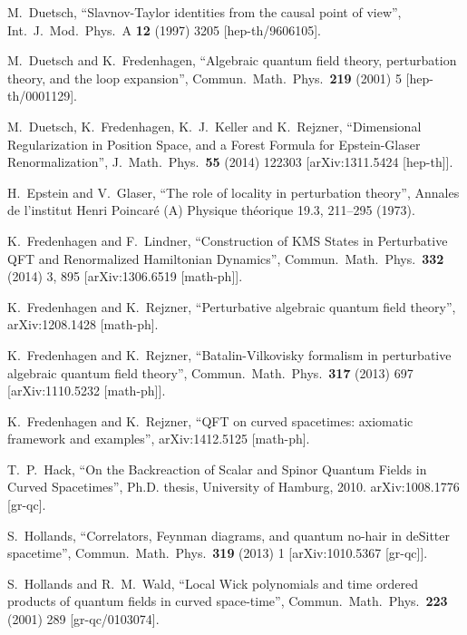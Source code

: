 \documentclass[a4paper,10pt,twoside]{article}
\numberwithin{equation}{section}
\newcounter{and}
\theoremstyle{plain}
\theoremstyle{definition}
\begin{document}
\begin{thebibliography}{100}
  M.~Duetsch,
  ``Slavnov-Taylor identities from the causal point of view'',
  Int.\ J.\ Mod.\ Phys.\ A {\bf 12} (1997) 3205
  [hep-th/9606105].
  
  M.~Duetsch and K.~Fredenhagen,
  ``Algebraic quantum field theory, perturbation theory, and the loop expansion'',
  Commun.\ Math.\ Phys.\  {\bf 219} (2001) 5
  [hep-th/0001129].
  
  M.~Duetsch, K.~Fredenhagen, K.~J.~Keller and K.~Rejzner,
  ``Dimensional Regularization in Position Space, and a Forest Formula for Epstein-Glaser Renormalization'',
  J.\ Math.\ Phys.\  {\bf 55} (2014) 122303
  [arXiv:1311.5424 [hep-th]].  

  H.~Epstein and V.~Glaser, 
  ``The role of locality in perturbation theory'',
  Annales de l'institut Henri Poincaré (A) Physique théorique 19.3, 211--295 (1973).

  K.~Fredenhagen and F.~Lindner,
  ``Construction of KMS States in Perturbative QFT and Renormalized Hamiltonian Dynamics'',
  Commun.\ Math.\ Phys.\  {\bf 332} (2014) 3,  895
  [arXiv:1306.6519 [math-ph]].
  
  K.~Fredenhagen and K.~Rejzner,
  ``Perturbative algebraic quantum field theory'',
  arXiv:1208.1428 [math-ph].
  
  K.~Fredenhagen and K.~Rejzner,
  ``Batalin-Vilkovisky formalism in perturbative algebraic quantum field theory'',
  Commun.\ Math.\ Phys.\  {\bf 317} (2013) 697
  [arXiv:1110.5232 [math-ph]].
  
  K.~Fredenhagen and K.~Rejzner,
  ``QFT on curved spacetimes: axiomatic framework and examples'',
  arXiv:1412.5125 [math-ph].

  T.~P.~Hack,
  ``On the Backreaction of Scalar and Spinor Quantum Fields in Curved Spacetimes'',
  Ph.D. thesis, University of Hamburg, 2010.
  arXiv:1008.1776 [gr-qc].

  S.~Hollands,
  ``Correlators, Feynman diagrams, and quantum no-hair in deSitter spacetime'',
  Commun.\ Math.\ Phys.\  {\bf 319} (2013) 1
  [arXiv:1010.5367 [gr-qc]].  

  S.~Hollands and R.~M.~Wald,
  ``Local Wick polynomials and time ordered products of quantum fields in curved space-time'',
  Commun.\ Math.\ Phys.\  {\bf 223} (2001) 289
  [gr-qc/0103074].
  

\end{thebibliography}
\end{document}
